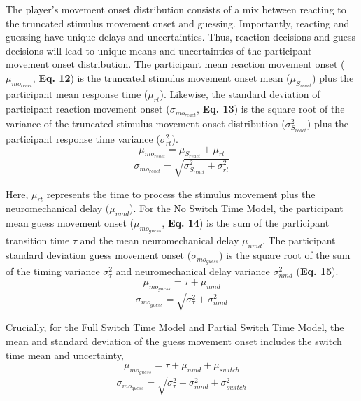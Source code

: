 \documentclass[man,floatsintext,letterpaper,12pt]{apa7}
\newcommand\boldblue[1]{\textcolor{mydarkblue}{\textbf{#1}}}
\begin{document}
The player’s movement onset distribution consists of a mix between reacting to the truncated stimulus movement onset and guessing. Importantly, reacting and guessing have unique delays and uncertainties. Thus, reaction decisions and guess decisions will lead to unique means and uncertainties of the participant movement onset distribution.
The participant mean reaction movement onset ($\mu_{mo_{react}}$, \boldblue{Eq. 12}) is the truncated stimulus movement onset mean ($\mu_{S_{react}}$) plus the participant mean response time ($\mu_{rt}$). Likewise, the standard deviation of participant reaction movement onset ($\sigma_{mo_{react}}$, \boldblue{Eq. 13}) is the square root of the variance of the truncated stimulus movement onset distribution ($\sigma_{S_{react}}^2$) plus the participant response time variance ($\sigma_{rt}^2$).
\begin{equation}
    \mu_{mo_{react}} = \mu_{S_{react}} + \mu_{rt}
\end{equation}
\begin{equation}
    \sigma_{mo_{react}} = \sqrt{\sigma_{S_{react}}^2 + \sigma_{rt}^2}
\end{equation}

Here, $\mu_{rt}$ represents the time to process the stimulus movement plus the neuromechanical delay ($\mu_{nmd}$).
For the No Switch Time Model, the participant mean guess movement onset ($\mu_{mo_{guess}}$, \boldblue{Eq. 14}) is the sum of the participant transition time $\tau$ and the mean neuromechanical delay $\mu_{nmd}$. The participant standard deviation guess movement onset ($\sigma_{mo_{guess}}$) is the square root of the sum of the timing variance $\sigma_{\tau}^2$ and neuromechanical delay variance $\sigma_{nmd}^2$ (\boldblue{Eq. 15}).
%
\begin{equation}
    \mu_{mo_{guess}} = \tau +  \mu_{nmd}
\end{equation}
\begin{equation}
    \sigma_{mo_{guess}} = \sqrt{\sigma_{\tau}^2 + \sigma_{nmd}^2}
\end{equation}

Crucially, for the Full Switch Time Model and Partial Switch Time Model, the mean and standard deviation of the guess movement onset includes the switch time mean and uncertainty,
\begin{equation}
    \mu_{mo_{guess}} = \tau +  \mu_{nmd} + \mu_{switch}
\end{equation}
\begin{equation}
    \sigma_{mo_{guess}} = \sqrt{\sigma_{\tau}^2 + \sigma_{nmd}^2 + \sigma_{switch}^2}
\end{equation}
\end{document}
